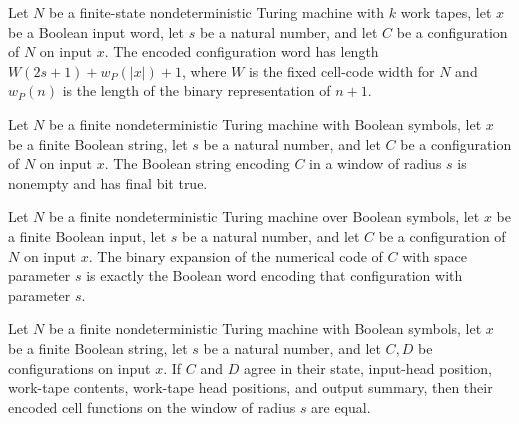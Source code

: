 \begin{lemma}
\label{Complexity.Codec.length_cfgWord}
\leanok
{}
Let $N$ be a finite-state nondeterministic Turing machine with $k$ work tapes, let $x$
be a Boolean input word, let $s$ be a natural number, and let $C$ be a configuration of
$N$ on input $x$. The encoded configuration word has length $W(2s+1)+w_P(|x|)+1$, where
$W$ is the fixed cell-code width for $N$ and $w_P(n)$ is the length of the binary
representation of $n+1$.
\end{lemma}

\begin{lemma}
\label{Complexity.Codec.canon_cfgWord}
\leanok
{}
Let $N$ be a finite nondeterministic Turing machine with Boolean symbols, let $x$ be a
finite Boolean string, let $s$ be a natural number, and let $C$ be a configuration of
$N$ on input $x$. The Boolean string encoding $C$ in a window of radius $s$ is nonempty
and has final bit true.
\end{lemma}

\begin{theorem}
\label{Complexity.Codec.bits_cfgCode}
\leanok
{}
Let $N$ be a finite nondeterministic Turing machine over Boolean symbols, let $x$ be a
finite Boolean input, let $s$ be a natural number, and let $C$ be a configuration of $N$
on input $x$. The binary expansion of the numerical code of $C$ with space parameter $s$
is exactly the Boolean word encoding that configuration with parameter $s$.
\end{theorem}

\begin{lemma}
\label{Complexity.Codec.cellOf_congr}
\leanok
{}
Let $N$ be a finite nondeterministic Turing machine with Boolean symbols, let $x$ be a
finite Boolean string, let $s$ be a natural number, and let $C,D$ be configurations on
input $x$. If $C$ and $D$ agree in their state, input-head position, work-tape contents,
work-tape head positions, and output summary, then their encoded cell functions on the
window of radius $s$ are equal.
\end{lemma}

